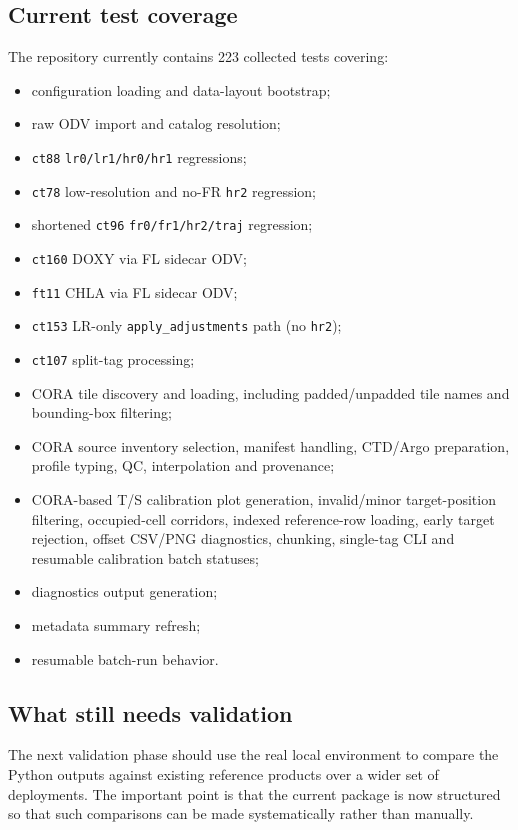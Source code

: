\documentclass[11pt,a4paper]{article}
\newcommand{\pkg}[1]{\texttt{#1}}
\begin{document}
\subsection{Current test coverage}

The repository currently contains 223 collected tests covering:

\begin{itemize}[leftmargin=1.5em]
  \item configuration loading and data-layout bootstrap;
  \item raw ODV import and catalog resolution;
  \item \pkg{ct88} \pkg{lr0/lr1/hr0/hr1} regressions;
  \item \pkg{ct78} low-resolution and no-FR \pkg{hr2} regression;
  \item shortened \pkg{ct96} \pkg{fr0/fr1/hr2/traj} regression;
  \item \pkg{ct160} DOXY via FL sidecar ODV;
  \item \pkg{ft11} CHLA via FL sidecar ODV;
  \item \pkg{ct153} LR-only \pkg{apply\_adjustments} path (no \pkg{hr2});
  \item \pkg{ct107} split-tag processing;
  \item CORA tile discovery and loading, including padded/unpadded tile names and
  bounding-box filtering;
  \item CORA source inventory selection, manifest handling, CTD/Argo preparation,
  profile typing, QC, interpolation and provenance;
  \item CORA-based T/S calibration plot generation, invalid/minor target-position
  filtering, occupied-cell corridors, indexed reference-row loading, early target
  rejection, offset CSV/PNG diagnostics, chunking, single-tag CLI and resumable
  calibration batch statuses;
  \item diagnostics output generation;
  \item metadata summary refresh;
  \item resumable batch-run behavior.
\end{itemize}

\subsection{What still needs validation}

The next validation phase should use the real local environment to compare the Python outputs against existing reference products over a wider set of deployments. The important point is that the current package is now structured so that such comparisons can be made systematically rather than manually.
\end{document}
